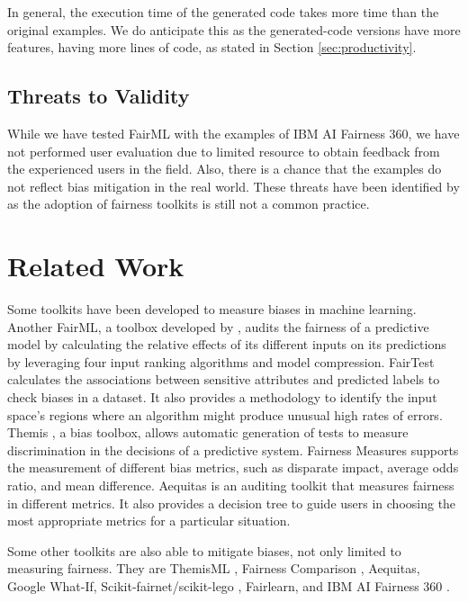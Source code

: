 \documentclass[sigconf,review]{acmart}
\begin{document}
In general, the execution time of the generated code takes more time than the original examples. 
We do anticipate this as the generated-code versions have more features, having more lines of code,
as stated in Section \ref{sec:productivity}. 

\subsection{Threats to Validity}
\label{sec:threats_to_validity}
While we have tested FairML with the examples of IBM AI Fairness 360, we have not performed user evaluation due to limited resource to obtain feedback from the experienced users in the field. Also, there is a chance that the examples do not reflect bias mitigation in the real world. These threats have been identified by \cite{lee2021landscape} as the adoption of fairness toolkits is still not a common practice.

\section{Related Work}
\label{sec:related_work}

Some toolkits have been developed to measure biases in machine learning. 
Another FairML, a toolbox developed by \cite{adebayo2016fairml}, audits the fairness of a predictive model by calculating the relative effects of its different inputs on its predictions by leveraging four input ranking algorithms and model compression. 
FairTest \cite{tramer2017fairtest} calculates the associations between sensitive attributes and predicted labels to check biases in a dataset. It also provides a methodology to identify the input space's regions where an algorithm might produce unusual high rates of errors.
Themis \cite{galhotra2017themis}, a bias toolbox, allows automatic generation of tests to measure discrimination in the decisions of a predictive system.
Fairness Measures \cite{zehlike2017fairness} supports the measurement of different bias metrics, such as disparate impact, average odds ratio, and mean difference. 
Aequitas \cite{saleiro2019aequitas} is an auditing toolkit that measures fairness in different metrics. It also provides a decision tree to guide users in choosing the most appropriate metrics for a particular situation. 

Some other toolkits are also able to mitigate biases, not only limited to measuring fairness. They are ThemisML \cite{bantilan2018themis}, Fairness Comparison \cite{friedler2019fairness}, Aequitas\cite{saleiro2019aequitas}, Google What-If\cite{googlewhatif2020}, Scikit-fairnet/scikit-lego \cite{scikitfairness2022,scikitlego2022}, Fairlearn\cite{bird2020fairlearn}, and IBM AI Fairness 360 \cite{bellamy2018ai}.
\end{document}
